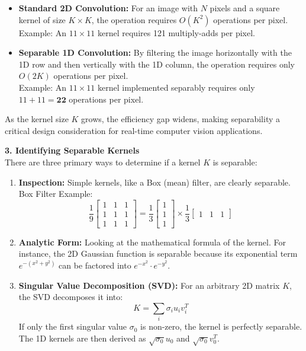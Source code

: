 \documentclass[12pt]{article}
\begin{document}
\begin{itemize}
    \item \textbf{Standard 2D Convolution:} For an image with $N$ pixels and a square kernel of size $K \times K$, the operation requires $O(K^2)$ operations per pixel. \\
          Example: An $11 \times 11$ kernel requires 121 multiply-adds per pixel.
    \item \textbf{Separable 1D Convolution:} By filtering the image horizontally with the 1D row and then vertically with the 1D column, the operation requires only $O(2K)$ operations per pixel. \\
          Example: An $11 \times 11$ kernel implemented separably requires only $11 + 11 = \mathbf{22}$ operations per pixel.
\end{itemize}

As the kernel size $K$ grows, the efficiency gap widens, making separability a critical design consideration for real-time computer vision applications.

\textbf{3. Identifying Separable Kernels} \\
There are three primary ways to determine if a kernel $K$ is separable:

\begin{enumerate}[label=\alph*.]
    \item \textbf{Inspection:} Simple kernels, like a Box (mean) filter, are clearly separable. \\
          Box Filter Example:
          \[
              \frac{1}{9} \begin{bmatrix} 1 & 1 & 1 \\ 1 & 1 & 1 \\ 1 & 1 & 1 \end{bmatrix}
              = \frac{1}{3} \begin{bmatrix} 1 \\ 1 \\ 1 \end{bmatrix}
              \times \frac{1}{3} \begin{bmatrix} 1 & 1 & 1 \end{bmatrix}
          \]

    \item \textbf{Analytic Form:} Looking at the mathematical formula of the kernel. For instance, the 2D Gaussian function is separable because its exponential term $e^{-(x^2+y^2)}$ can be factored into $e^{-x^2} \cdot e^{-y^2}$.

    \item \textbf{Singular Value Decomposition (SVD):} For an arbitrary 2D matrix $K$, the SVD decomposes it into:
          \[
              K = \sum_{i} \sigma_i u_i v_i^T
          \]
          If only the first singular value $\sigma_0$ is non-zero, the kernel is perfectly separable. The 1D kernels are then derived as $\sqrt{\sigma_0} u_0$ and $\sqrt{\sigma_0} v_0^T$.
\end{enumerate}
\end{document}
